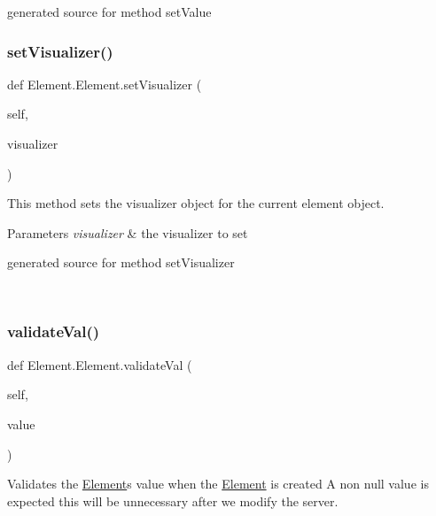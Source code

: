 \begin{DoxyVerb}generated source for method setValue \end{DoxyVerb}
 \hypertarget{class_element_1_1_element_a79f1e429c47e65341273e9971ff1ece0}{}\label{class_element_1_1_element_a79f1e429c47e65341273e9971ff1ece0} 
\subsubsection{\texorpdfstring{set\+Visualizer()}{setVisualizer()}}
{\footnotesize\ttfamily def Element.\+Element.\+set\+Visualizer (\begin{DoxyParamCaption}\item[{}]{self,  }\item[{}]{visualizer }\end{DoxyParamCaption})}



This method sets the visualizer object for the current element object. 


\begin{DoxyParams}{Parameters}
{\em visualizer} & the visualizer to set\begin{DoxyVerb}generated source for method setVisualizer \end{DoxyVerb}
 \\
\hline
\end{DoxyParams}
\hypertarget{class_element_1_1_element_ae864741d8f6e980b2ecb4bed62e87e96}{}\label{class_element_1_1_element_ae864741d8f6e980b2ecb4bed62e87e96} 
\subsubsection{\texorpdfstring{validate\+Val()}{validateVal()}}
{\footnotesize\ttfamily def Element.\+Element.\+validate\+Val (\begin{DoxyParamCaption}\item[{}]{self,  }\item[{}]{value }\end{DoxyParamCaption})}



Validates the \hyperlink{class_element_1_1_element}{Element}\textquotesingle{}s value when the \hyperlink{class_element_1_1_element}{Element} is created A non null value is expected this will be unnecessary after we modify the server. 


